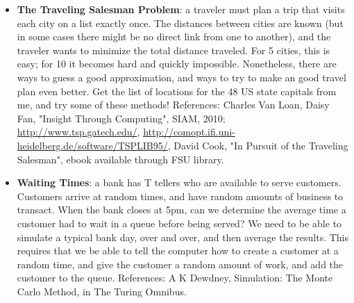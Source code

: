 \documentclass{article}
\begin{document}
\begin{itemize}
\item \textbf{The Traveling Salesman Problem}: a traveler must plan a trip that visits each city on a list exactly once. The distances between cities are known (but in some cases there might be no direct link from one to another), and the traveler wants to minimize the total distance traveled. For 5 cities, this is easy; for 10 it becomes hard and quickly impossible. Nonetheless, there are ways to guess a good approximation, and ways to try to make an good travel plan even better. Get the list of locations for the 48 US state capitals from me, and try some of these methods! References: Charles Van Loan, Daisy Fan, "Insight Through Computing", SIAM, 2010; \url{http://www.tsp.gatech.edu/}, \url{http://comopt.ifi.uni-heidelberg.de/software/TSPLIB95/}, David Cook, "In Pursuit of the Traveling Salesman", ebook available through FSU library.

\item\textbf{ Waiting Times}: a bank has T tellers who are available to serve customers. Customers arrive at random times, and have random amounts of business to transact. When the bank closes at 5pm, can we determine the average time a customer had to wait in a queue before being served? We need to be able to simulate a typical bank day, over and over, and then average the results. This requires that we be able to tell the computer how to create a customer at a random time, and give the customer a random amount of work, and add the customer to the queue. References: A K Dewdney, Simulation: The Monte Carlo Method, in The Turing Omnibus.
\end{itemize}
\end{document}
